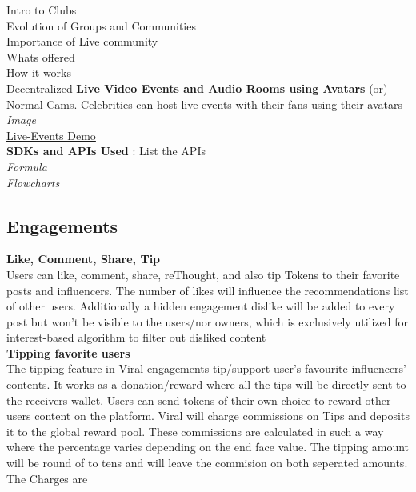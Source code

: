 \documentclass[conference]{IEEEtran}
\begin{document}
Intro to Clubs\\

Evolution of Groups and Communities\\

Importance of Live community\\

Whats offered\\

How it works\\


Decentralized \textbf{Live Video Events and Audio Rooms using Avatars} (or) Normal Cams. Celebrities can host live events with their fans using their avatars\\

\textit{Image}\\
\hyperlink{https://sample.com}{Live-Events Demo}\\

\textbf{SDKs and APIs Used} : List the APIs\\

\textit{Formula\\
Flowcharts}

\subsection{\textbf{Engagements}}

\textbf{Like, Comment, Share, Tip}\\

Users can like, comment, share, reThought, and also tip Tokens to their favorite posts and influencers. The number of likes will influence the recommendations list of other users. Additionally a hidden engagement dislike will be added to every post but won't be visible to the users/nor owners, which is exclusively utilized for interest-based algorithm to filter out disliked content\\

\textbf{Tipping favorite users}\\

The tipping feature in Viral engagements tip/support user's favourite influencers' contents. It works as a donation/reward where all the tips will be directly sent to the receivers wallet. Users can send tokens of their own choice to reward other users content on the platform. Viral will charge commissions on Tips and deposits it to the global reward pool. These commissions are calculated in such a way where the percentage varies depending on the end face value. The tipping amount will be round of to tens and will leave the commision on both seperated amounts. The Charges are\\
\end{document}
